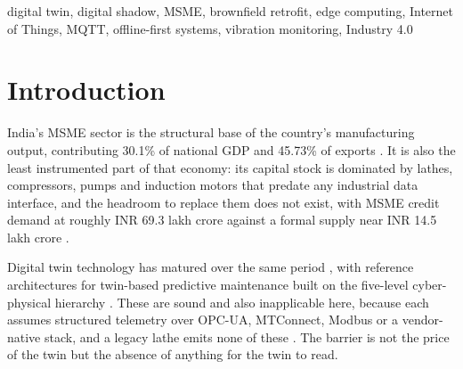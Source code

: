 \documentclass[conference]{IEEEtran}
\begin{document}
\begin{abstract}
Micro, Small and Medium Enterprises (MSMEs) contribute 30.1\% of India's
gross domestic product and 45.73\% of its exports, yet most of their
production assets are legacy machines with no industrial data interface of
the kind commercial digital twin platforms presuppose. This paper presents
Digital Cousin, a twin built on three properties: single-asset in scope,
edge-first in execution, natural-language accessible in interface. This
paper reports Phase~1, its monitoring foundation.
One rotary machine is retrofitted non-invasively with a MEMS accelerometer
and a 1-Wire temperature probe. A 64-sample burst at a configured 800~Hz
output data rate is reduced on-device to four AC-coupled statistical
features, and a single five-second publish cycle persists both sensor
channels at a measured 0.2~Hz into two separate SQLite tables. The resulting state
object has exactly one writer and leaves its model-derived fields explicitly
null, so Phase~2 populates them without a schema migration. A local REST
service and an offline-capable dashboard render live telemetry and
deterministic threshold alerts with no network egress. Deployment costs
approximately INR 20,000 in one-time hardware, with no licence and no cloud
dependency. We report the architecture, the retrofit protocol, the
evaluation plan and the bring-up findings that amended it.
\end{abstract}

\begin{IEEEkeywords}
digital twin, digital shadow, MSME, brownfield retrofit, edge computing,
Internet of Things, MQTT, offline-first systems, vibration monitoring,
Industry 4.0
\end{IEEEkeywords}

\section{Introduction}

India's MSME sector is the structural base of the country's manufacturing
output, contributing 30.1\% of national GDP and 45.73\% of exports
\cite{b36}. It is also the least instrumented part of that economy: its
capital stock is dominated by lathes, compressors, pumps and induction
motors that predate any industrial data interface, and the headroom to
replace them does not exist, with MSME credit demand at roughly INR 69.3
lakh crore against a formal supply near INR 14.5 lakh crore \cite{b37}.

Digital twin technology has matured over the same period \cite{b1}, with
reference architectures for twin-based predictive maintenance \cite{b3}
built on the five-level cyber-physical hierarchy \cite{b2}. These are sound
and also inapplicable here, because each assumes structured telemetry over
OPC-UA, MTConnect, Modbus or a vendor-native stack, and a legacy lathe emits
none of these \cite{b4}. The barrier is not the price of the twin but the
absence of anything for the twin to read.
\end{document}
